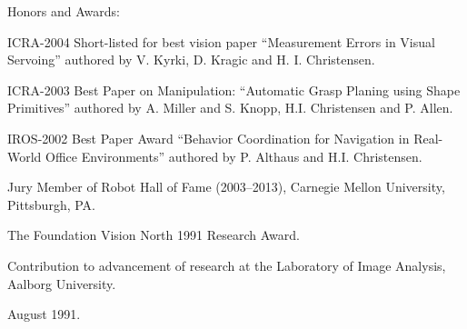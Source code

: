 \documentclass{article}
\newenvironment{sublist}{%
  \begin{list}{}{%
      \setlength{\itemsep}{0em}\setlength{\parsep}{0em}%
      \setlength{\topsep}{0em}\setlength{\parskip}{0em}%
    }%
}%
{ \end{list} }
\begin{document}
\begin{cv}
\begin{cvlist}{Honors and Awards:}
\begin{sublist}
  \end{sublist}
\item ICRA-2004 Short-listed for best vision paper ``Measurement
  Errors in Visual Servoing'' authored by V. Kyrki, D. Kragic and H.  I. Christensen.
\item ICRA-2003 Best Paper on Manipulation:  ``Automatic
  Grasp Planing using Shape Primitives'' authored by A. Miller and
  S. Knopp, H.I. Christensen and P. Allen.
\item IROS-2002 Best Paper Award ``Behavior Coordination for
  Navigation in Real-World Office Environments'' authored by
  P. Althaus and H.I. Christensen.
\item Jury Member of Robot Hall of Fame (2003--2013), Carnegie Mellon
  University, Pittsburgh, PA.
\item The Foundation Vision North 1991 Research Award.
  \begin{sublist}
  \item Contribution to advancement of research at the Laboratory of
    Image Analysis, Aalborg University.
  \item August 1991.
  \end{sublist}
\end{cvlist}
\end{cv}
\end{document}
